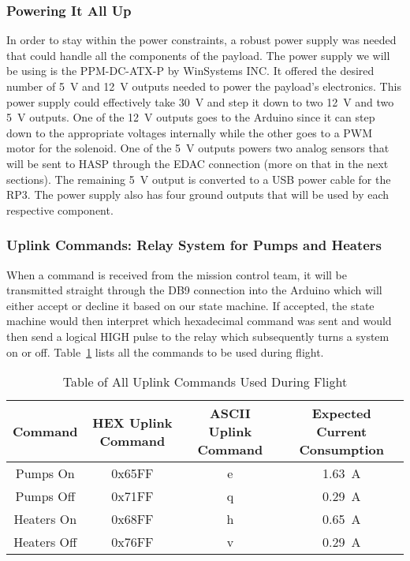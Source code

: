 \subsubsection{Powering It All Up}

In order to stay within the power constraints, a robust power supply was needed that could handle all the components of the payload.  The power supply we will be using is the PPM-DC-ATX-P by WinSystems INC.  It offered the desired number of \SI{+5}{\volt} and \SI{+12}{\volt} outputs needed to power the payload's electronics.  This power supply could effectively take \SI{+30}{\volt} and step it down to two \SI{+12}{\volt} and two \SI{+5 }{\volt} outputs.  One of the \SI{+12}{\volt} outputs goes to the Arduino since it can step down to the appropriate voltages internally while the other goes to a PWM motor for the solenoid.  One of the \SI{+5 }{\volt} outputs powers two analog sensors that will be sent to HASP through the EDAC connection (more on that in the next sections).  The remaining \SI{+5 }{\volt} output is converted to a USB power cable for the RP3.  The power supply also has four ground outputs that will be used by each respective component. 

\subsubsection{Uplink Commands: Relay System for Pumps and Heaters}

When a command is received from the mission control team, it will be transmitted straight through the DB9 connection into the Arduino which will either accept or decline it based on our state machine.  If accepted, the state machine would then interpret which hexadecimal command was sent and would then send a logical HIGH pulse to the relay which subsequently turns a system on or off.  Table~\ref{tab:All-Commands} lists all the commands to be used during flight.

\begin{table}[!ht]
\centering
\caption{Table of All Uplink Commands Used During Flight} 
\label{tab:All-Commands}
\bigskip
\begin{tabular}{|c|c|c|c|}
\hline
\multicolumn{1}{|c|}{\bfseries Command} & \multicolumn{1}{c|}{\bfseries HEX Uplink Command} &  \multicolumn{1}{c|}{\bfseries ASCII Uplink Command} & \multicolumn{1}{c|}{\bfseries Expected Current Consumption} \\
\hline
    Pumps On     	& 0x65FF 	& e	 & \SI{1.63}{\ampere}   \\ \hline %
    Pumps Off    	& 0x71FF 	& q	 & \SI{0.29}{\ampere}    \\ \hline
    Heaters On  	& 0x68FF 	& h	 & \SI{0.65}{\ampere}    \\ \hline %
    Heaters Off 	& 0x76FF 	& v	 & \SI{0.29}{\ampere}    \\ \hline
\end{tabular}
\medskip
\end{table}

